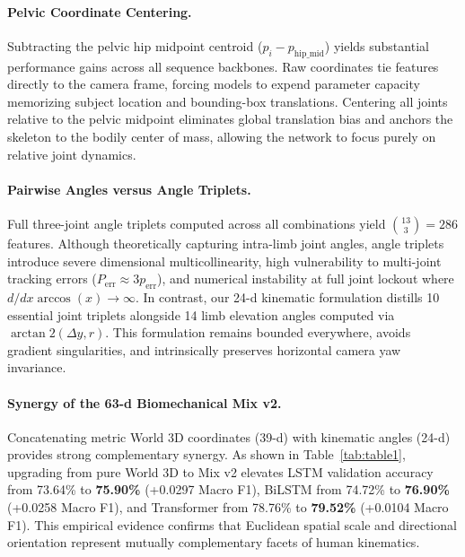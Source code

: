 \documentclass[runningheads]{llncs}
\begin{document}
\paragraph{Pelvic Coordinate Centering.} Subtracting the pelvic hip midpoint centroid ($p_i - p_{\text{hip\_mid}}$) yields substantial performance gains across all sequence backbones. Raw coordinates tie features directly to the camera frame, forcing models to expend parameter capacity memorizing subject location and bounding-box translations. Centering all joints relative to the pelvic midpoint eliminates global translation bias and anchors the skeleton to the bodily center of mass, allowing the network to focus purely on relative joint dynamics.

\paragraph{Pairwise Angles versus Angle Triplets.} Full three-joint angle triplets computed across all combinations yield $\binom{13}{3} = 286$ features. Although theoretically capturing intra-limb joint angles, angle triplets introduce severe dimensional multicollinearity, high vulnerability to multi-joint tracking errors ($P_{\text{err}} \approx 3p_{\text{err}}$), and numerical instability at full joint lockout where $d/dx \arccos(x) \to \infty$. In contrast, our 24-d kinematic formulation distills 10 essential joint triplets alongside 14 limb elevation angles computed via $\arctan2(\Delta y, r)$. This formulation remains bounded everywhere, avoids gradient singularities, and intrinsically preserves horizontal camera yaw invariance.

\paragraph{Synergy of the 63-d Biomechanical Mix v2.} Concatenating metric World 3D coordinates (39-d) with kinematic angles (24-d) provides strong complementary synergy. As shown in Table~\ref{tab:table1}, upgrading from pure World 3D to Mix v2 elevates LSTM validation accuracy from 73.64\% to \textbf{75.90\%} (+0.0297 Macro F1), BiLSTM from 74.72\% to \textbf{76.90\%} (+0.0258 Macro F1), and Transformer from 78.76\% to \textbf{79.52\%} (+0.0104 Macro F1). This empirical evidence confirms that Euclidean spatial scale and directional orientation represent mutually complementary facets of human kinematics.
\end{document}
